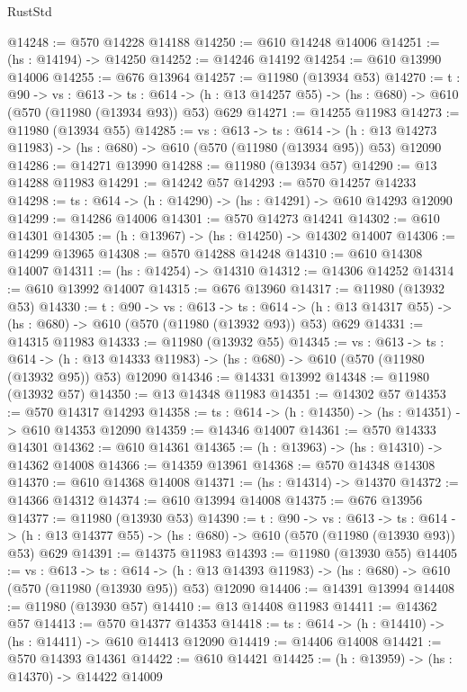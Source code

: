 \begin{lexlean}{RustStd}
\begin{coremodule}
@14248 := @570 @14228 @14188
@14250 := @610 @14248 @14006
@14251 := (hs : @14194) -> @14250
@14252 := @14246 @14192
@14254 := @610 @13990 @14006
@14255 := @676 @13964
@14257 := @11980 (@13934 @53)
@14270 := {t : @90} ->
  {vs : @613} ->
  {ts : @614} -> (h : @13 @14257 @55) -> (hs : @680) -> @610 (@570 (@11980 (@13934 @93)) @53) @629
@14271 := @14255 @11983
@14273 := @11980 (@13934 @55)
@14285 := {vs : @613} ->
  {ts : @614} ->
  (h : @13 @14273 @11983) -> (hs : @680) -> @610 (@570 (@11980 (@13934 @95)) @53) @12090
@14286 := @14271 @13990
@14288 := @11980 (@13934 @57)
@14290 := @13 @14288 @11983
@14291 := @14242 @57
@14293 := @570 @14257 @14233
@14298 := {ts : @614} -> (h : @14290) -> (hs : @14291) -> @610 @14293 @12090
@14299 := @14286 @14006
@14301 := @570 @14273 @14241
@14302 := @610 @14301
@14305 := (h : @13967) -> (hs : @14250) -> @14302 @14007
@14306 := @14299 @13965
@14308 := @570 @14288 @14248
@14310 := @610 @14308 @14007
@14311 := (hs : @14254) -> @14310
@14312 := @14306 @14252
@14314 := @610 @13992 @14007
@14315 := @676 @13960
@14317 := @11980 (@13932 @53)
@14330 := {t : @90} ->
  {vs : @613} ->
  {ts : @614} -> (h : @13 @14317 @55) -> (hs : @680) -> @610 (@570 (@11980 (@13932 @93)) @53) @629
@14331 := @14315 @11983
@14333 := @11980 (@13932 @55)
@14345 := {vs : @613} ->
  {ts : @614} ->
  (h : @13 @14333 @11983) -> (hs : @680) -> @610 (@570 (@11980 (@13932 @95)) @53) @12090
@14346 := @14331 @13992
@14348 := @11980 (@13932 @57)
@14350 := @13 @14348 @11983
@14351 := @14302 @57
@14353 := @570 @14317 @14293
@14358 := {ts : @614} -> (h : @14350) -> (hs : @14351) -> @610 @14353 @12090
@14359 := @14346 @14007
@14361 := @570 @14333 @14301
@14362 := @610 @14361
@14365 := (h : @13963) -> (hs : @14310) -> @14362 @14008
@14366 := @14359 @13961
@14368 := @570 @14348 @14308
@14370 := @610 @14368 @14008
@14371 := (hs : @14314) -> @14370
@14372 := @14366 @14312
@14374 := @610 @13994 @14008
@14375 := @676 @13956
@14377 := @11980 (@13930 @53)
@14390 := {t : @90} ->
  {vs : @613} ->
  {ts : @614} -> (h : @13 @14377 @55) -> (hs : @680) -> @610 (@570 (@11980 (@13930 @93)) @53) @629
@14391 := @14375 @11983
@14393 := @11980 (@13930 @55)
@14405 := {vs : @613} ->
  {ts : @614} ->
  (h : @13 @14393 @11983) -> (hs : @680) -> @610 (@570 (@11980 (@13930 @95)) @53) @12090
@14406 := @14391 @13994
@14408 := @11980 (@13930 @57)
@14410 := @13 @14408 @11983
@14411 := @14362 @57
@14413 := @570 @14377 @14353
@14418 := {ts : @614} -> (h : @14410) -> (hs : @14411) -> @610 @14413 @12090
@14419 := @14406 @14008
@14421 := @570 @14393 @14361
@14422 := @610 @14421
@14425 := (h : @13959) -> (hs : @14370) -> @14422 @14009

\end{coremodule}
\end{lexlean}
